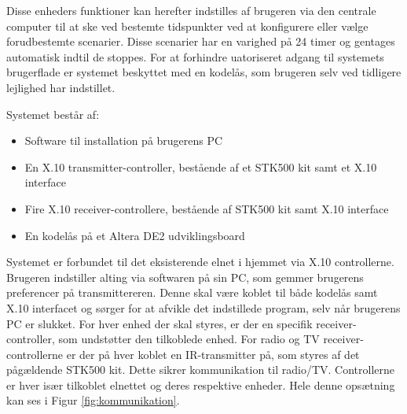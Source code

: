 Disse enheders funktioner kan herefter indstilles af brugeren via den centrale computer til at ske ved bestemte tidspunkter ved at konfigurere eller vælge forudbestemte scenarier. Disse scenarier har en varighed på 24 timer og gentages automatisk indtil de stoppes.
For at forhindre uatoriseret adgang til systemets brugerflade er systemet beskyttet med en kodelås, som brugeren selv ved tidligere lejlighed har indstillet.

Systemet består af:
\begin{itemize}
\item Software til installation på brugerens PC
\item En X.10 transmitter-controller, bestående af et STK500 kit samt et X.10 interface
\item Fire X.10 receiver-controllere, bestående af STK500 kit samt X.10 interface
\item En kodelås på et Altera DE2 udviklingsboard
\end{itemize}

Systemet er forbundet til det eksisterende elnet i hjemmet via X.10 controllerne. Brugeren indstiller alting via softwaren på sin PC, som gemmer brugerens preferencer på transmittereren. Denne skal være koblet til både kodelås samt X.10 interfacet og sørger for at afvikle det indstillede program, selv når brugerens PC er slukket. For hver enhed der skal styres, er der en specifik receiver-controller, som undstøtter den tilkoblede enhed. For radio og TV receiver-controllerne er der på hver koblet en IR-transmitter på, som styres af det pågældende STK500 kit. Dette sikrer kommunikation til radio/TV. Controllerne er hver især tilkoblet elnettet og deres respektive enheder. Hele denne opsætning kan ses i Figur \ref{fig:kommunikation}.

